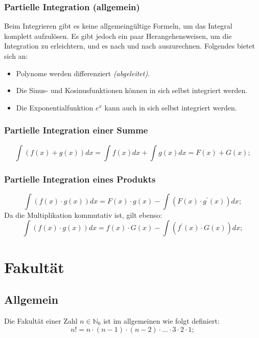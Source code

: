 \documentclass[a4paper]{article}
\begin{document}
\subsubsection{Partielle Integration (allgemein)}
Beim Integrieren gibt es keine allgemeingültige Formeln, um das Integral komplett
aufzulösen. Es gibt jedoch ein paar Herangehensweisen, um die Integration zu erleichtern, und es nach und nach auszurechnen. Folgendes bietet sich an:
\begin{itemize}
	\item Polynome werden differenziert \textit{(abgeleitet)}.
	\item Die Sinus- und Kosinusfunktionen können in sich selbst integriert werden.
	\item Die Exponentialfunktion $ e^x $ kann auch in sich selbst integriert werden.
\end{itemize}

\subsubsection{Partielle Integration einer Summe}
\[
	\int \left( f(x) + g(x) \right) dx = \int f(x) dx + \int g(x) dx = F(x) + G(x) ;
\]

\subsubsection{Partielle Integration eines Produkts}
\[
	\int \left( f(x) \cdot g(x) \right) dx = F(x) \cdot g(x) - \int \left( F(x) \cdot g^\prime(x) \right) dx ;
\]
Da die Multiplikation kommutativ ist, gilt ebenso:
\[
	\int \left( f(x) \cdot g(x) \right) dx = f(x) \cdot G(x) - \int \left( f^\prime(x) \cdot G(x) \right) dx ;
\]

\section{Fakultät}

\subsection{Allgemein}
Die Fakultät einer Zahl $n \in \mathbb{N}_0$ ist im allgemeinen wie folgt definiert:
\[
	n! = n \cdot (n - 1) \cdot (n - 2) \cdot ... \cdot 3 \cdot 2 \cdot 1 ;
\]
\end{document}
